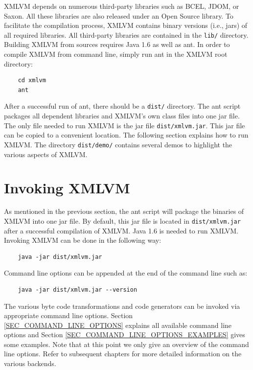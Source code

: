 \documentclass[11pt]{book}
\begin{document}
XMLVM depends on numerous third-party libraries such as BCEL, JDOM, or
Saxon. All these libraries are also released under an Open Source
library. To facilitate the compilation process, XMLVM contains binary
versions (i.e., jars) of all required libraries. All third-party
libraries are contained in the \texttt{lib/} directory. Building XMLVM
from sources requires Java 1.6 as well as ant. In order to compile
XMLVM from command line, simply run ant in the XMLVM root directory:

\begin{verbatim}
    cd xmlvm
    ant
\end{verbatim}

After a successful run of ant, there should be a \texttt{dist/}
directory. The ant script packages all dependent libraries and XMLVM's
own class files into one jar file. The only file needed to run XMLVM
is the jar file \texttt{dist/xmlvm.jar}. This jar file can be copied
to a convenient location. The following section explains how to run
XMLVM. The directory \texttt{dist/demo/} contains several demos to
highlight the various aspects of XMLVM.


\section{Invoking XMLVM}
\label{SEC_INVOKING_XMLVM}

As mentioned in the previous section, the ant script will package the
binaries of XMLVM into one jar file. By default, this jar file is
located in \texttt{dist/xmlvm.jar} after a successful compilation of
XMLVM. Java 1.6 is needed to run XMLVM. Invoking XMLVM can be done in
the following way:

\begin{verbatim}
    java -jar dist/xmlvm.jar
\end{verbatim}

Command line options can be appended at the end of the command line
such as:

\begin{verbatim}
    java -jar dist/xmlvm.jar --version
\end{verbatim}

The various byte code transformations and code generators can be
invoked via appropriate command line options. Section
\ref{SEC_COMMAND_LINE_OPTIONS} explains all available command line
options and Section \ref{SEC_COMMAND_LINE_OPTIONS_EXAMPLES} gives some
examples. Note that at this point we only give an overview of the
command line options. Refer to subsequent chapters for more detailed
information on the various backends.
\end{document}
